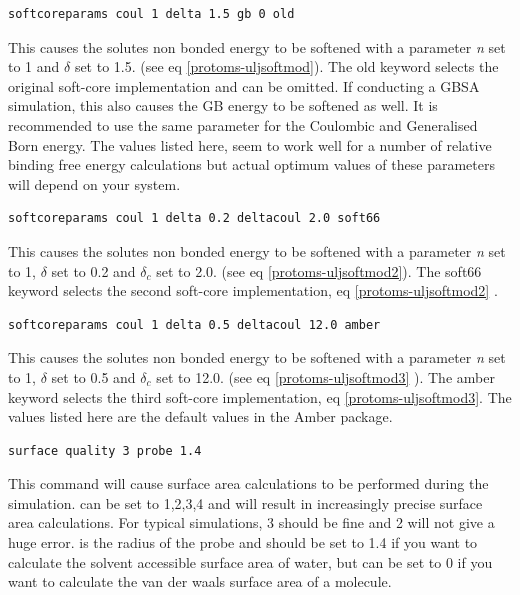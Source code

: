 \documentclass[letterpaper,10pt,english]{sphinxmanual}
\begin{document}
\begin{Verbatim}[commandchars=\\\{\}]
softcoreparams coul 1 delta 1.5 gb 0 old
\end{Verbatim}

This causes the solutes non bonded energy to be softened with a parameter \emph{n} set to 1 and \(\delta\) set to 1.5. (see eq \eqref{protoms-uljsoftmod}). The old keyword selects the original soft-core implementation and can be omitted. If conducting a GBSA simulation, this also causes the GB energy to be softened as well. It is recommended to use the same parameter for the Coulombic and Generalised Born energy. The values listed here, seem to work well for a number of relative binding free energy calculations but actual optimum values of these parameters will depend on your system.

\begin{Verbatim}[commandchars=\\\{\}]
softcoreparams coul 1 delta 0.2 deltacoul 2.0 soft66
\end{Verbatim}

This causes the solutes non bonded energy to be softened with a parameter \emph{n} set to 1, \(\delta\) set to 0.2 and \(\delta_c\) set to 2.0. (see eq \eqref{protoms-uljsoftmod2}). The soft66 keyword selects the second soft-core implementation, eq \eqref{protoms-uljsoftmod2} .

\begin{Verbatim}[commandchars=\\\{\}]
softcoreparams coul 1 delta 0.5 deltacoul 12.0 amber
\end{Verbatim}

This causes the solutes non bonded energy to be softened with a parameter \emph{n} set to 1, \(\delta\) set to 0.5 and \(\delta_c\)  set to 12.0. (see eq \eqref{protoms-uljsoftmod3} ). The amber keyword selects the third soft-core implementation, eq \eqref{protoms-uljsoftmod3}. The values listed here are the default values in the Amber package.

\begin{Verbatim}[commandchars=\\\{\}]
surface quality 3 probe 1.4
\end{Verbatim}

This command will cause surface area calculations to be performed during the simulation.  can be set to 1,2,3,4 and will result in increasingly precise surface area calculations. For typical simulations, 3 should be fine and 2 will not give a huge error.  is the radius of the probe and should be set to 1.4 if you want to calculate the solvent accessible surface area of water, but can be set to 0 if you want to calculate the van der waals surface area of a molecule.
\end{document}
